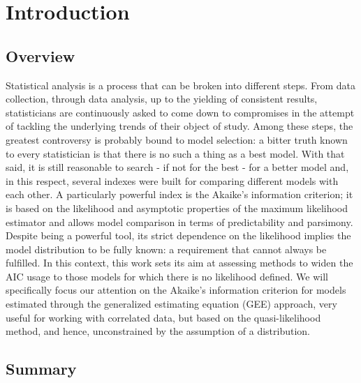 \chapter*{Introduction} %



\fancyhead[RO,LE]{\thepage}

\setlength{\parskip}{0.5pt}

\bigskip

\section*{Overview}
\large Statistical analysis is a process that can be broken into different steps. 
From data collection, through data analysis, up to the yielding of consistent results, statisticians are continuously asked to come down to compromises in the attempt of tackling the underlying trends of their object of study. 
Among these steps, the greatest controversy is probably bound to model selection: a bitter truth known to every statistician is that there is no such a thing as a best model. With that said, it is still reasonable to search - if not for the best - for a better model and, in this respect, several indexes were built for comparing different models with each other. %
A particularly powerful index is the Akaike's information criterion; it is based on the
likelihood and asymptotic properties of the maximum likelihood estimator and allows model comparison in terms of predictability and parsimony. %
Despite being a powerful tool, its strict dependence on the likelihood implies the model distribution to be fully known: a requirement that cannot always be fulfilled. In this context, this work sets its aim at assessing methods to widen the AIC usage to those models for which there is no likelihood defined. We will specifically focus our attention on the Akaike's information criterion for models estimated through the generalized estimating equation (GEE) approach, very useful for working with correlated data, but 
based on the quasi-likelihood method, and hence, unconstrained by the assumption of a distribution. 
\noindent


{}
\newpage
\section*{Summary}

